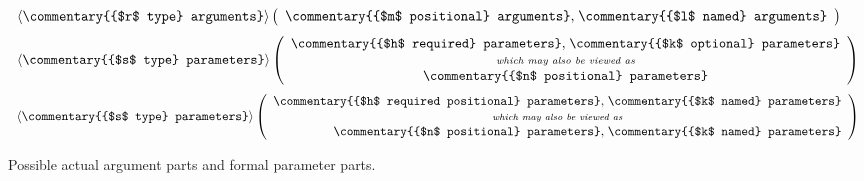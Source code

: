 \documentclass[makeidx]{article}
\begin{document}
{%
%
%
%
\begin{figure}[h]
  \def\A#1{\mbox{\commentary{{#1} arguments}}}
  \def\P#1{\mbox{\commentary{{#1} parameters}}}
  \begin{displaymath}
    \begin{array}{rl}
      \left<\A{$r$ type}\right>
      \left(
      \begin{array}{r@{,\;}l}
        \A{$m$ positional}&\A{$l$ named}
      \end{array}
      \right)
    \end{array}
  \end{displaymath}
  \begin{displaymath}
    \begin{array}{rl}
      \left<\P{$s$ type}\right>
      \left(
      \begin{array}{r@{,\;}l}
        \P{$h$ required}&\P{$k$ optional}\\
        \multicolumn{2}{c}{\mbox{\scriptsize\textit{which may also be viewed as}}}\\
        \multicolumn{2}{c}{\P{$n$ positional}}
      \end{array}
      \right)
    \end{array}
  \end{displaymath}
  \begin{displaymath}
    \begin{array}{rl}
      \left<\P{$s$ type}\right>
      \left(
      \begin{array}{r@{,\;}l}
        \P{$h$ required positional}&\P{$k$ named}\\
        \multicolumn{2}{c}{\mbox{\scriptsize\textit{which may also be viewed as}}}\\
        \P{$n$ positional}&\P{$k$ named}\\
      \end{array}
      \right)
    \end{array}
  \end{displaymath}
  \caption{Possible actual argument parts and formal parameter parts.}
  \label{fig:argumentsAndParameters}
\end{figure}

}
\end{document}
